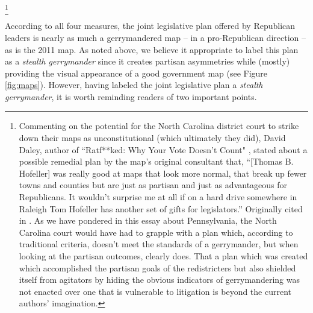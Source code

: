         \footnote{Commenting on the potential for the North Carolina district court to strike down their maps as unconstitutional (which ultimately they did), David Daley, author of ``Ratf**ked: Why Your Vote Doesn't Count" \cite{Daley2016_ratf**ked}, stated about a possible remedial plan by the map's original consultant that, ``[Thomas B. Hofeller] was really good at maps that look more normal, that break up fewer towns and counties but are just as partisan and just as advantageous for Republicans. It wouldn’t surprise me at all if on a hard drive somewhere in Raleigh Tom Hofeller has another set of gifts for legislators.” Originally cited in \citet{Barnett2018_NC_gerry}. As we have pondered in this essay about Pennsylvania, the North Carolina court would have had to grapple with a plan which, according to traditional criteria, doesn't meet the standards of a gerrymander, but when looking at the partisan outcomes, clearly does. That a plan which was created which accomplished the partisan goals of the redistricters but also shielded itself from agitators by hiding the obvious indicators of gerrymandering was not enacted over one that is vulnerable to litigation is beyond the current authors' imagination.}
\par
    According to all four measures, the joint legislative plan offered by Republican leaders is nearly as much a gerrymandered map -- in a pro-Republican direction -- as is the 2011 map. As noted above, we believe it appropriate to label this plan as a \textit{stealth gerrymander} since it creates partisan asymmetries while (mostly) providing the visual appearance of a good government map (see Figure \ref{fig:maps}). However, having labeled the joint legislative plan a \textit{stealth gerrymander}, it is worth reminding readers of two important points. 
\par

